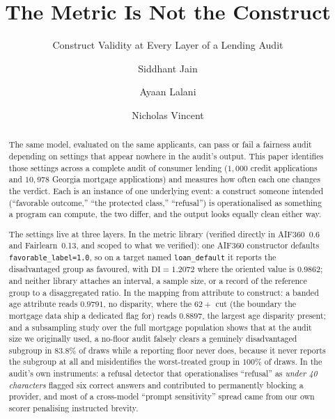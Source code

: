 \documentclass[sigconf,nonacm]{acmart}
\begin{document}
\title{The Metric Is Not the Construct}
\subtitle{Construct Validity at Every Layer of a Lending Audit}

\author{Siddhant Jain}

\author{Ayaan Lalani}

\author{Nicholas Vincent}

\renewcommand{\shortauthors}{Jain, Lalani, and Vincent}

\begin{abstract}
The same model, evaluated on the same applicants, can pass or fail a fairness
audit depending on settings that appear nowhere in the audit's output. This
paper identifies those settings across a complete audit of consumer lending
($1{,}000$ credit applications and $10{,}978$ Georgia mortgage applications)
and measures how often each one changes the verdict. Each is an instance of
one underlying event: a construct someone intended (``favorable outcome,''
``the protected class,'' ``refusal'') is operationalised as something a
program can compute, the two differ, and the output looks equally clean
either way.

The settings live at three layers. In the metric library (verified directly
in AIF360~0.6 and Fairlearn~0.13, and scoped to what we verified): one AIF360
constructor defaults \texttt{favorable\_label=1.0}, so on a target named
\texttt{loan\_default} it reports the disadvantaged group as favoured, with
$\mathrm{DI}=1.2072$ where the oriented value is $0.9862$; and neither
library attaches an interval, a sample size, or a record of the reference
group to a disaggregated ratio. In the mapping from attribute to construct: a
banded age attribute reads $0.9791$, no disparity, where the $62{+}$ cut (the
boundary the mortgage data ship a dedicated flag for) reads $0.8897$, the
largest age disparity present; and a subsampling study over the full mortgage
population shows that at the audit size we originally used, a no-floor audit
falsely clears a genuinely disadvantaged subgroup in $83.8\%$ of draws while
a reporting floor never does, because it never reports the subgroup at all
and misidentifies the worst-treated group in $100\%$ of draws. In the audit's
own instruments: a refusal detector that operationalises ``refusal'' as
\emph{under 40 characters} flagged six correct answers and contributed to
permanently blocking a provider, and most of a cross-model ``prompt
sensitivity'' spread came from our own scorer penalising instructed brevity.


\end{abstract}
\end{document}
